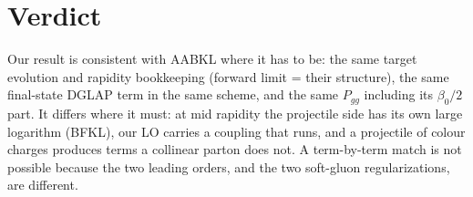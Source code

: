 \documentclass[10pt]{article}
\numberwithin{equation}{section}
\begin{document}
\section{Verdict}
Our result is consistent with AABKL where it has to be: the same target evolution and rapidity bookkeeping (forward limit = their structure), the same final-state DGLAP term in the same scheme, and the same $P_{gg}$ including its $\beta_0/2$ part. It differs where it must: at mid rapidity the projectile side has its own large logarithm (BFKL), our LO carries a coupling that runs, and a projectile of colour charges produces terms a collinear parton does not. A term-by-term match is not possible because the two leading orders, and the two soft-gluon regularizations, are different.
\end{document}
